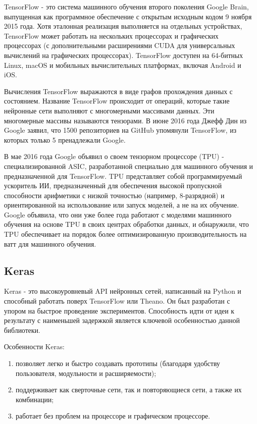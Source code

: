 TensorFlow - это система машинного обучения второго поколения Google Brain, выпущенная как программное обеспечение с открытым исходным кодом 9 ноября 2015 года. Хотя эталонная реализация выполняется на отдельных устройствах, TensorFlow может работать на нескольких процессорах и графических процессорах (с дополнительными расширениями CUDA для универсальных вычислений на графических процессорах). TensorFlow доступен на 64-битных Linux, macOS и мобильных вычислительных платформах, включая Android и iOS.

Вычисления TensorFlow выражаются в виде графов прохождения данных с состоянием. Название TensorFlow происходит от операций, которые такие нейронные сети выполняют с многомерными массивами данных. Эти многомерные массивы называются тензорами. В июне 2016 года Джефф Дин из Google заявил, что 1500 репозиториев на GitHub упомянули TensorFlow, из которых только 5 пренадлежали Google.

В мае 2016 года Google объявил о своем тензорном процессоре (TPU) - специализированной ASIC, разработанной специально для машинного обучения и предназначенной для TensorFlow. TPU представляет собой программируемый ускоритель ИИ, предназначенный для обеспечения высокой пропускной способности арифметики с низкой точностью (например, 8-разрядной) и ориентированной на использование или запуск моделей, а не на их обучение. Google объявила, что они уже более года работают с моделями машинного обучения на основе TPU в своих центрах обработки данных, и обнаружили, что TPU обеспечивает на порядок более оптимизированную производительность на ватт для машинного обучения.

\subsection{Keras}
\label{sec:development:keras}

Keras - это высокоуровневый API нейронных сетей, написанный на Python и способный работать поверх TensorFlow или Theano. Он был разработан с упором на быстрое проведение экспериментов. Способность идти от идеи к результату с наименьшей задержкой является ключевой особенностью данной библиотеки.

Особенности Keras:
\begin{enumerate}
  \item позволяет легко и быстро создавать прототипы (благодаря удобству пользователя, модульности и расширяемости);
  \item поддерживает как сверточные сети, так и повторяющиеся сети, а также их комбинации;
  \item работает без проблем на процессоре и графическом процессоре.
\end{enumerate}

